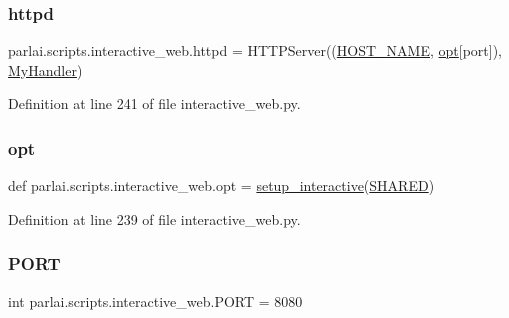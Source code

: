 \subsubsection{\texorpdfstring{httpd}{httpd}}
{\footnotesize\ttfamily parlai.\+scripts.\+interactive\+\_\+web.\+httpd = H\+T\+T\+P\+Server((\hyperlink{namespaceparlai_1_1scripts_1_1interactive__web_ac440a61641ae161806beba8dbb9d39b8}{H\+O\+S\+T\+\_\+\+N\+A\+ME}, \hyperlink{namespaceparlai_1_1scripts_1_1interactive__web_a022cc4d0c500e7a2ba643446d3b0e6ef}{opt}\mbox{[}\textquotesingle{}port\textquotesingle{}\mbox{]}), \hyperlink{classparlai_1_1scripts_1_1interactive__web_1_1MyHandler}{My\+Handler})}



Definition at line 241 of file interactive\+\_\+web.\+py.

\mbox{\label{namespaceparlai_1_1scripts_1_1interactive__web_a022cc4d0c500e7a2ba643446d3b0e6ef}} 
\subsubsection{\texorpdfstring{opt}{opt}}
{\footnotesize\ttfamily def parlai.\+scripts.\+interactive\+\_\+web.\+opt = \hyperlink{namespaceparlai_1_1scripts_1_1interactive__web_abeab09cab4f9e60077ffd5050bff36ef}{setup\+\_\+interactive}(\hyperlink{namespaceparlai_1_1scripts_1_1interactive__web_a86b356c6390faf2398bdbde02a6664d6}{S\+H\+A\+R\+ED})}



Definition at line 239 of file interactive\+\_\+web.\+py.

\mbox{\label{namespaceparlai_1_1scripts_1_1interactive__web_adab4200a8fab70115b4a5c6592ba596a}} 
\subsubsection{\texorpdfstring{P\+O\+RT}{PORT}}
{\footnotesize\ttfamily int parlai.\+scripts.\+interactive\+\_\+web.\+P\+O\+RT = 8080}



